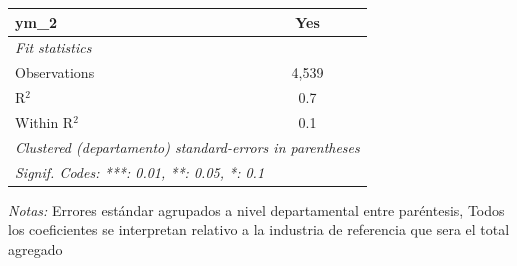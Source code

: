 \documentclass[12pt]{article}
\begin{document}
\begin{table}[htbp]
\begin{threeparttable}
\begin{tabular}{lc}
      ym\_2                                                                                                                       & Yes\\  
      \midrule
      \emph{Fit statistics}\\
      Observations                                                                                                                & 4,539\\  
      R$^2$                                                                                                                       & 0.7\\  
      Within R$^2$                                                                                                                & 0.1\\  
      \midrule \midrule
      \multicolumn{2}{l}{\emph{Clustered (departamento) standard-errors in parentheses}}\\
      \multicolumn{2}{l}{\emph{Signif. Codes: ***: 0.01, **: 0.05, *: 0.1}}\\
   \end{tabular}


\begin{tablenotes}
\footnotesize
\item \textit{Notas:} Errores estándar agrupados a nivel departamental entre paréntesis, Todos los coeficientes se interpretan relativo a la industria de referencia que sera el total agregado
\end{tablenotes}
\end{threeparttable}
\end{table}
\end{document}
